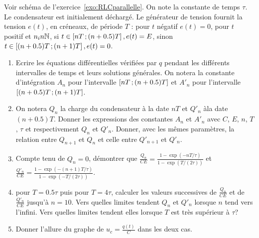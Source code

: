 \begin{exercice}%
  Voir schéma de l'exercice~\ref{exo:RLCparallelle}. On note la constante de 
  temps \(\tau\). Le condensateur est initialement déchargé. Le générateur de 
  tension fournit la tension \(e(t)\), en créneaux, de période \(T\) : pour 
  \(t\) négatif \(e(t)=0\), pour \(t\) positif et \(n _in \mathbb{N}\), si \(t \in 
  \left[ nT \, ;  (n+0.5)T \right], e(t)=E\), sinon \(t \in 
  \left[ (n+0.5)T \, ;  (n+1)T \right], e(t)=0\).
  \begin{enumerate}
    \item Ecrire les équations différentielles vérifiées par \(q\) pendant les 
      différents intervalles de temps et leurs solutions générales. On notera 
      la constante d'intégration \(A_n\) pour l'intervalle 
      \(\left[ nT \, ;  (n+0.5)T \right]\) et \(A'_n\) pour l'intervalle 
      \(\left[ (n+0.5)T \, ;  (n+1)T \right]\).
    \item On notera \(Q_n\) la charge du condensateur à la date \(nT\) et 
      \(Q'_n\) àla date \((n+0.5)T\). Donner les expressions des constantes 
      \(A_n\) et \(A'_n\) avec \(C\), \(E\), \(n\), \(T\), \(\tau\) et 
      respectivement \(Q_n\) et \(Q'_n\). Donner, avec les mêmes paramètres, la 
      relation entre \(Q_{n+1}\) et \(Q_n\) et celle entre \(Q'_{n+1}\) et 
      \(Q'_n\).
    \item Compte tenu de \(Q_n=0\), démontrer que \(\frac{Q_n}{CE} = 
      \frac{1-\exp(-nT/\tau)}{1-\exp(T/(2\tau))}\) et \(\frac{Q'_n}{CE} = 
      \frac{1-\exp(-(n+1)T/\tau)}{1-\exp(-T/(2\tau))}\).
    \item pour \(T=0.5 \tau\) puis pour \(T=4\tau\), calculer les valeurs 
      successives de \(\frac{Q_n}{CE}\) et de \(\frac{Q'_n}{CE}\) jusqu'à 
      \(n=10\). Vers quelles limites tendent \(Q_n\) et \(Q'_n\) lorsque \(n\) 
      tend vers l'infini. Vers quelles limites tendent elles lorsque \(T\) est 
      très supérieur à \(\tau\)?
    \item Donner l'allure du graphe de \(u_c = \frac{q(t)}{C}\) dans les deux 
      cas.
  \end{enumerate}
\end{exercice}%
